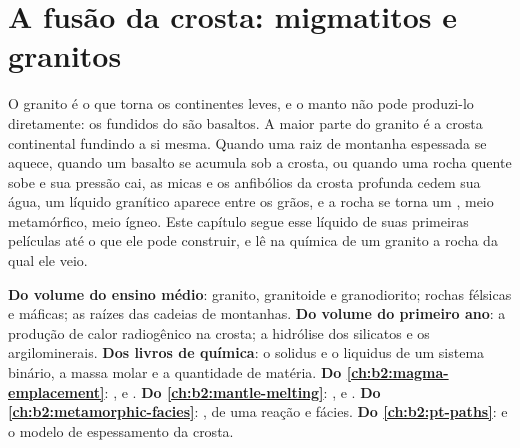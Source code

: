 \chapter{A fusão da crosta: migmatitos e granitos}\label{ch:b2:crustal-melting}

O granito é o que torna os continentes leves, e o manto não pode produzi-lo diretamente: os
fundidos do  são basaltos. A maior parte do granito é a crosta continental fundindo a si mesma.
Quando uma raiz de montanha espessada se aquece, quando um basalto se acumula sob a crosta, ou quando uma rocha
quente sobe e sua pressão cai, as micas e os anfibólios da crosta profunda cedem
sua água, um líquido granítico aparece entre os grãos, e a rocha se torna um
, meio metamórfico, meio ígneo. Este capítulo segue esse líquido de suas primeiras
películas até o  que ele pode construir, e lê na química de um granito a rocha da qual ele
veio.

\begin{recall}
\textbf{Do volume do ensino médio}: granito, granitoide e granodiorito; rochas félsicas e máficas;
as raízes das cadeias de montanhas. \textbf{Do volume do primeiro ano}: a produção de calor radiogênico
na crosta; a hidrólise dos silicatos e os argilominerais. \textbf{Dos livros de química}: o solidus e o liquidus
de um sistema binário, a massa molar e a quantidade de matéria. \textbf{Do
\cref{ch:b2:magma-emplacement}}: ,  e . \textbf{Do
\cref{ch:b2:mantle-melting}}: ,  e . \textbf{Do \cref{ch:b2:metamorphic-facies}}: ,  de
uma reação e fácies. \textbf{Do \cref{ch:b2:pt-paths}}:  e o
modelo de espessamento da crosta.
\end{recall}

